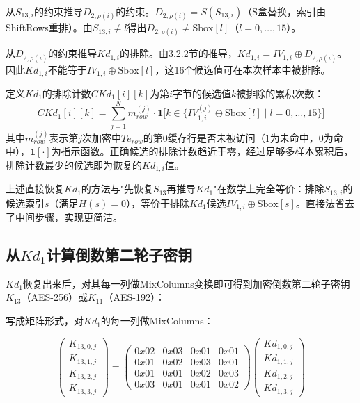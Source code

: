 从$S_{13,i}$的约束推导$D_{2,\rho(i)}$的约束。$D_{2,\rho(i)} = S(S_{13,i})$（S盒替换，索引由ShiftRows重排）。由$S_{13,i} \neq l$得出$D_{2,\rho(i)} \neq \text{Sbox}[l]$（$l = 0, \dots, 15$）。

从$D_{2,\rho(i)}$的约束推导$Kd_{1,i}$的排除。由3.2.2节的推导，$Kd_{1,i} = IV_{1,i} \oplus D_{2,\rho(i)}$。因此$Kd_{1,i}$不能等于$IV_{1,i} \oplus \text{Sbox}[l]$，这16个候选值可在本次样本中被排除。

定义$Kd_1$的排除计数$CKd_1[i][k]$为第$i$字节的候选值$k$被排除的累积次数：
\begin{equation}
CKd_1[i][k] = \sum_{j=1}^{N} m_{row}^{(j)} \cdot \mathbf{1}\bigl[k \in \{IV_{1,i}^{(j)} \oplus \text{Sbox}[l] \mid l = 0, \dots, 15\}\bigr]
\end{equation}
其中$m_{row}^{(j)}$表示第$j$次加密中$Te_{row}$的第0缓存行是否未被访问（1为未命中，0为命中），$\mathbf{1}[\cdot]$为指示函数。正确候选的排除计数趋近于零，经过足够多样本累积后，排除计数最少的候选即为恢复的$Kd_{1,i}$值。

上述直接恢复$Kd_1$的方法与"先恢复$S_{13}$再推导$Kd_1$"在数学上完全等价：排除$S_{13,i}$的候选索引$s$（满足$H(s)=0$），等价于排除$Kd_1$候选$IV_{1,i} \oplus \text{Sbox}[s]$。直接法省去了中间步骤，实现更简洁。

\subsection{从$Kd_1$计算倒数第二轮子密钥}

$Kd_1$恢复出来后，对其每一列做MixColumns变换即可得到加密倒数第二轮子密钥$K_{13}$（AES-256）或$K_{11}$（AES-192）：

写成矩阵形式，对$Kd_1$的每一列做MixColumns：

\begin{equation}
\begin{pmatrix} K_{13,0,j} \\ K_{13,1,j} \\ K_{13,2,j} \\ K_{13,3,j} \end{pmatrix} = \begin{pmatrix} 0x02 & 0x03 & 0x01 & 0x01 \\ 0x01 & 0x02 & 0x03 & 0x01 \\ 0x01 & 0x01 & 0x02 & 0x03 \\ 0x03 & 0x01 & 0x01 & 0x02 \end{pmatrix} \begin{pmatrix} Kd_{1,0,j} \\ Kd_{1,1,j} \\ Kd_{1,2,j} \\ Kd_{1,3,j} \end{pmatrix}
\end{equation}

